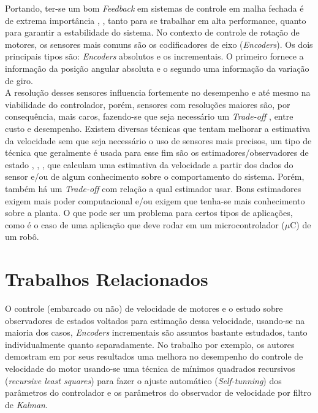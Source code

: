 Portando, ter-se um bom \emph{Feedback} em sistemas de controle em malha fechada é de extrema importância \cite{analise_incr_enc}, \cite{simple_speed_feedback}, tanto para se trabalhar em alta performance, quanto para garantir a estabilidade do sistema. No contexto de controle de rotação de motores, os sensores mais comuns são os codificadores de eixo (\emph{Encoders}). Os dois principais tipos são: \emph{Encoders} absolutos e os incrementais. O primeiro fornece a informação da posição angular absoluta e o segundo uma informação da variação de giro. \\

A resolução desses sensores influencia fortemente no desempenho e até mesmo na viabilidade do controlador, porém, sensores com resoluções maiores são, por consequência, mais caros, fazendo-se que seja necessário um \emph{Trade-off} \cite{analise_incr_enc}, \cite{low_precision_encoder01} entre custo e desempenho. Existem diversas técnicas que tentam melhorar a estimativa da velocidade sem que seja necessário o uso de sensores mais precisos, um tipo de técnica que geralmente é usada para esse fim são os estimadores/observadores de estado \cite{analise_incr_enc}, \cite{speed_observer_IA}, \cite{observer_speed}, que calculam uma estimativa da velocidade a partir dos dados do sensor e/ou de algum conhecimento sobre o comportamento do sistema. Porém, também há um \emph{Trade-off} com relação a qual estimador usar. Bons estimadores exigem mais poder computacional e/ou exigem que tenha-se mais conhecimento sobre a planta. O que pode ser um problema para certos tipos de aplicações, como é o caso de uma aplicação que deve rodar em um microcontrolador ($\mu$C) de um robô.\\

\section{Trabalhos Relacionados}

O controle (embarcado ou não) de velocidade de motores e o estudo sobre observadores de estados voltados para estimação dessa velocidade, usando-se na maioria dos casos, \emph{Encoders} incrementais são assuntos bastante estudados, tanto individualmente quanto separadamente. No trabalho \cite{low_precision_encoder01} por exemplo, os autores demostram em por seus resultados uma melhora no desempenho do controle de velocidade do motor usando-se uma técnica de mínimos quadrados recursivos (\emph{recursive least squares}) para fazer o ajuste automático (\emph{Self-tunning}) dos parâmetros do controlador e os parâmetros do observador de velocidade por filtro de \emph{Kalman}. 

